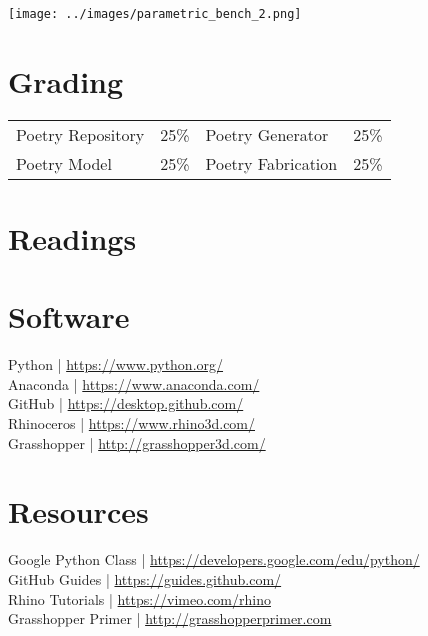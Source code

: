 \documentclass[11pt,article,oneside]{memoir}
\begin{document}
\texttt{[image: ../images/parametric\_bench\_2.png]}

\section{Grading}
%
\begin{table}[H]
\begin{tabular}{l r @{\hskip 2.5cm} l r}
%
Poetry Repository & 25\% & 
Poetry Generator & 25\% \\
Poetry Model & 25\% &
Poetry Fabrication & 25\% \\
%
\end{tabular}
\end{table}

\clearpage

\section{Readings}
\renewcommand*{\bibfont}{\normalsize} %
\vspace*{0.5cm}
\nocite{*}
\setlength{}
\printbibliography[heading=none]

\clearpage

\section{Software}
\begin{multicols}{2}
\raggedright
Python | \url{https://www.python.org/}\\
Anaconda | \url{https://www.anaconda.com/}\\
GitHub | \url{https://desktop.github.com/}\\
Rhinoceros | \url{https://www.rhino3d.com/}\\
Grasshopper | \url{http://grasshopper3d.com/}\\
\end{multicols}

\section{Resources}
Google Python Class | \url{https://developers.google.com/edu/python/}\\
GitHub Guides | \url{https://guides.github.com/}\\
Rhino Tutorials | \url{https://vimeo.com/rhino}\\
Grasshopper Primer | \url{http://grasshopperprimer.com}\\
\end{document}
